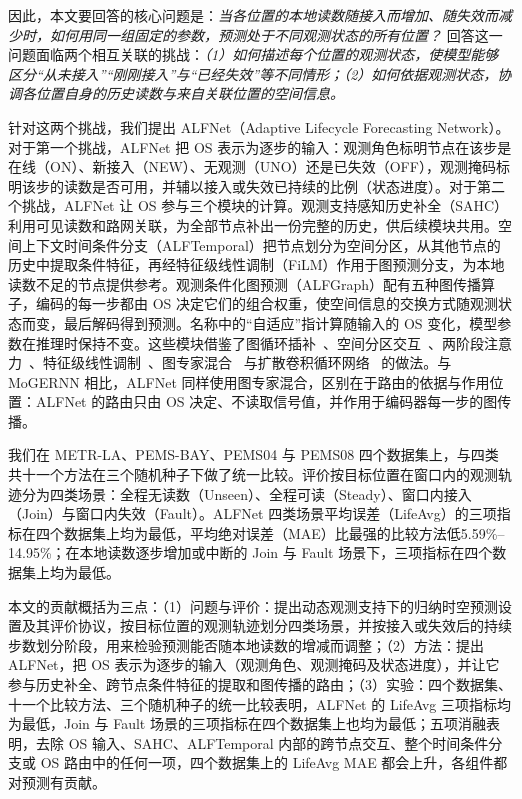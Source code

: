因此，本文要回答的核心问题是：\emph{当各位置的本地读数随接入而增加、随失效而减少时，如何用同一组固定的参数，预测处于不同观测状态的所有位置？} 回答这一问题面临两个相互关联的挑战：\emph{（1）如何描述每个位置的观测状态，使模型能够区分“从未接入”“刚刚接入”与“已经失效”等不同情形；（2）如何依据观测状态，协调各位置自身的历史读数与来自关联位置的空间信息。}

针对这两个挑战，我们提出 ALFNet（Adaptive Lifecycle Forecasting Network）。对于第一个挑战，ALFNet 把 OS 表示为逐步的输入：观测角色标明节点在该步是在线（ON）、新接入（NEW）、无观测（UNO）还是已失效（OFF），观测掩码标明该步的读数是否可用，并辅以接入或失效已持续的比例（状态进度）。对于第二个挑战，ALFNet 让 OS 参与三个模块的计算。观测支持感知历史补全（SAHC）利用可见读数和路网关联，为全部节点补出一份完整的历史，供后续模块共用。空间上下文时间条件分支（ALFTemporal）把节点划分为空间分区，从其他节点的历史中提取条件特征，再经特征级线性调制（FiLM）作用于图预测分支，为本地读数不足的节点提供参考。观测条件化图预测（ALFGraph）配有五种图传播算子，编码的每一步都由 OS 决定它们的组合权重，使空间信息的交换方式随观测状态而变，最后解码得到预测。名称中的“自适应”指计算随输入的 OS 变化，模型参数在推理时保持不变。这些模块借鉴了图循环插补~\citep{cini2022filling}、空间分区交互~\citep{fang2025efficient}、两阶段注意力~\citep{zhang2023crossformer}、特征级线性调制~\citep{perez2018film}、图专家混合~\citep{zhou2025mogernn,wang2023graph} 与扩散卷积循环网络~\citep{li2018diffusion} 的做法。与 MoGERNN 相比，ALFNet 同样使用图专家混合，区别在于路由的依据与作用位置：ALFNet 的路由只由 OS 决定、不读取信号值，并作用于编码器每一步的图传播。

我们在 METR-LA、PEMS-BAY、PEMS04 与 PEMS08 四个数据集上，与四类共十一个方法在三个随机种子下做了统一比较。评价按目标位置在窗口内的观测轨迹分为四类场景：全程无读数（Unseen）、全程可读（Steady）、窗口内接入（Join）与窗口内失效（Fault）。ALFNet 四类场景平均误差（LifeAvg）的三项指标在四个数据集上均为最低，平均绝对误差（MAE）比最强的比较方法低5.59\%–14.95\%；在本地读数逐步增加或中断的 Join 与 Fault 场景下，三项指标在四个数据集上均为最低。

本文的贡献概括为三点：（1）问题与评价：提出动态观测支持下的归纳时空预测设置及其评价协议，按目标位置的观测轨迹划分四类场景，并按接入或失效后的持续步数划分阶段，用来检验预测能否随本地读数的增减而调整；（2）方法：提出 ALFNet，把 OS 表示为逐步的输入（观测角色、观测掩码及状态进度），并让它参与历史补全、跨节点条件特征的提取和图传播的路由；（3）实验：四个数据集、十一个比较方法、三个随机种子的统一比较表明，ALFNet 的 LifeAvg 三项指标均为最低，Join 与 Fault 场景的三项指标在四个数据集上也均为最低；五项消融表明，去除 OS 输入、SAHC、ALFTemporal 内部的跨节点交互、整个时间条件分支或 OS 路由中的任何一项，四个数据集上的 LifeAvg MAE 都会上升，各组件都对预测有贡献。
